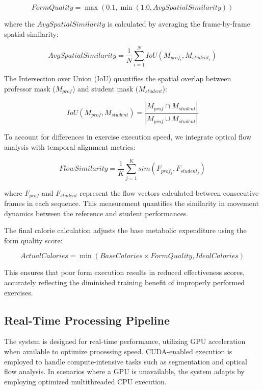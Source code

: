\documentclass[conference]{IEEEtran}
\begin{document}
\begin{equation} FormQuality = \max(0.1, \min(1.0, AvgSpatialSimilarity)) \end{equation}

where the $AvgSpatialSimilarity$ is calculated by averaging the frame-by-frame spatial similarity:

\begin{equation} AvgSpatialSimilarity = \frac{1}{N}\sum_{i=1}^{N}IoU(M_{prof_i}, M_{student_i}) \end{equation}

The Intersection over Union (IoU) quantifies the spatial overlap between professor mask ($M_{prof}$) and student mask ($M_{student}$):

\begin{equation} IoU(M_{prof}, M_{student}) = \frac{|M_{prof} \cap M_{student}|}{|M_{prof} \cup M_{student}|} \end{equation}

To account for differences in exercise execution speed, we integrate optical flow analysis with temporal alignment metrics:

\begin{equation} FlowSimilarity = \frac{1}{K}\sum_{j=1}^{K}sim(F_{prof_j}, F_{student_j}) \end{equation}

where $F_{prof}$ and $F_{student}$ represent the flow vectors calculated between consecutive frames in each sequence. This measurement quantifies the similarity in movement dynamics between the reference and student performances.

The final calorie calculation adjusts the base metabolic expenditure using the form quality score:

\begin{equation} ActualCalories = \min(BaseCalories \times FormQuality, IdealCalories) \end{equation}

This ensures that poor form execution results in reduced effectiveness scores, accurately reflecting the diminished training benefit of improperly performed exercises.

\subsection{Real-Time Processing Pipeline} 
The system is designed for real-time performance, utilizing GPU acceleration when available to optimize processing speed. CUDA-enabled execution is employed to handle compute-intensive tasks such as segmentation and optical flow analysis. In scenarios where a GPU is unavailable, the system adapts by employing optimized multithreaded CPU execution.
\end{document}
